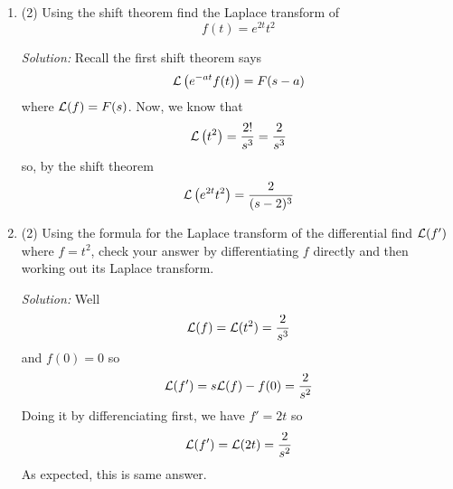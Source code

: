 \documentclass[12pt]{article}
\begin{document}
\begin{enumerate}
\item (2)
Using the shift theorem find the Laplace transform of
\[
f(t)=e^{2t}t^2
\]

\noindent\textit{Solution:}  Recall the first shift theorem says
\begin{equation}
{\cal L}\left(e^{-at}f(t)\right)=F(s-a)
\end{equation}
where ${\cal L}(f)=F(s)$. Now, we know that
\begin{equation}
{\cal L}\left(t^2\right)=\frac{2!}{s^3}=\frac{2}{s^3}
\end{equation}
so, by the shift theorem
\begin{equation}
{\cal L}\left(e^{2t}t^2\right)=\frac{2}{(s-2)^3}
\end{equation}

\item (2)
Using the formula for the Laplace transform of the differential find ${\cal L}(f')$ where $f=t^2$, check your answer by differentiating $f$ directly and then working out its Laplace transform.

\noindent\textit{Solution:} Well 
\begin{equation}
{\cal L}(f)={\cal L}(t^2)=\frac{2}{s^3}
\end{equation}
and $f(0)=0$ so
\begin{equation}
{\cal L}(f')=s{\cal L}(f)-f(0)=\frac{2}{s^2}
\end{equation}
Doing it by differenciating first, we have $f'=2t$ so
\begin{equation}
{\cal L}(f')={\cal L}(2t)=\frac{2}{s^2}
\end{equation}
As expected, this is same answer.



\end{enumerate}

\vfill

\noindent
\end{document}
